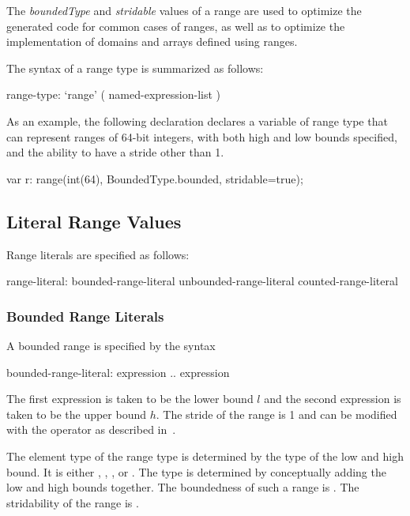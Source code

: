 \begin{rationale}
The \emph{boundedType} and \emph{stridable} values of a range are used
to optimize the generated code for common cases of ranges, as well as
to optimize the implementation of domains and arrays defined using
ranges.
\end{rationale}

The syntax of a range type is summarized as follows:
\begin{syntax}
range-type:
  `range' ( named-expression-list )
\end{syntax}

\begin{example}
As an example, the following declaration declares a variable 
of range type that can represent ranges of 64-bit integers, with both
high and low bounds specified, and the ability to have a stride other
than 1.
\begin{chapel}
var r: range(int(64), BoundedType.bounded, stridable=true);
\end{chapel}
\end{example}

\subsection{Literal Range Values}
\label{Range_Literals}

Range literals are specified as follows:
\begin{syntax}
range-literal:
  bounded-range-literal
  unbounded-range-literal
  counted-range-literal
\end{syntax}

\subsubsection{Bounded Range Literals}
\label{Bounded_Ranges}

A bounded range is specified by the syntax
\begin{syntax}
bounded-range-literal:
  expression .. expression
\end{syntax}
The first expression is taken to be the lower bound $l$ and the second
expression is taken to be the upper bound $h$.  The stride of the
range is 1 and can be modified with the  operator as described
in~.

The element type of the range type is determined by the type of the
low and high bound.  It is either , ,
, or .  The type is determined by
conceptually adding the low and high bounds together.  The boundedness
of such a range is .  The stridability of
the range is .

